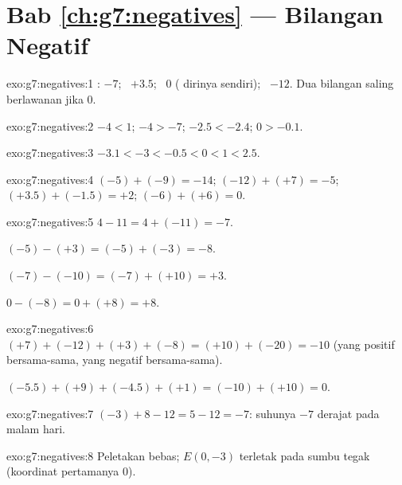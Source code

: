 \section*{Bab \ref{ch:g7:negatives} --- Bilangan Negatif}

\begin{solution}{exo:g7:negatives:1}
: $-7$; \ $+3.5$; \ $0$ ( dirinya sendiri); \ $-12$. Dua
bilangan saling berlawanan jika  $0$.
\end{solution}

\begin{solution}{exo:g7:negatives:2}
$-4 < 1$; \quad $-4 > -7$; \quad $-2.5 < -2.4$; \quad $0 > -0.1$.
\end{solution}

\begin{solution}{exo:g7:negatives:3}
$-3.1 < -3 < -0.5 < 0 < 1 < 2.5$.
\end{solution}

\begin{solution}{exo:g7:negatives:4}
$(-5) + (-9) = -14$; \quad
$(-12) + (+7) = -5$; \quad
$(+3.5) + (-1.5) = +2$; \quad
$(-6) + (+6) = 0$.
\end{solution}

\begin{solution}{exo:g7:negatives:5}
$4 - 11 = 4 + (-11) = -7$.

$(-5) - (+3) = (-5) + (-3) = -8$.

$(-7) - (-10) = (-7) + (+10) = +3$.

$0 - (-8) = 0 + (+8) = +8$.
\end{solution}

\begin{solution}{exo:g7:negatives:6}
$(+7) + (-12) + (+3) + (-8) = (+10) + (-20) = -10$ (yang positif
bersama-sama, yang negatif bersama-sama).

$(-5.5) + (+9) + (-4.5) + (+1) = (-10) + (+10) = 0$.
\end{solution}

\begin{solution}{exo:g7:negatives:7}
$(-3) + 8 - 12 = 5 - 12 = -7$: suhunya $-7$ derajat pada malam hari.
\end{solution}

\begin{solution}{exo:g7:negatives:8}
Peletakan bebas; $E(0, -3)$ terletak pada sumbu tegak (koordinat
pertamanya $0$).
\end{solution}

